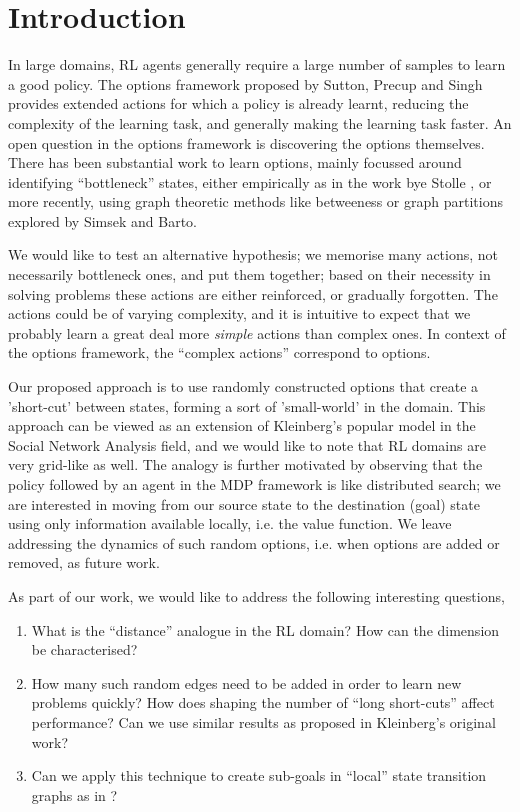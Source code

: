 \section{Introduction}
\label{sec:intro}

In large domains, RL agents generally require a large number of samples to learn
a good policy. The options framework proposed by Sutton, Precup and Singh
\cite{SuttonPrecupSingh1998} provides extended actions for which a policy is
already learnt, reducing the complexity of the learning task, and generally
making the learning task faster.  An open question in the options framework is
discovering the options themselves.  There has been substantial work to learn
options, mainly focussed around identifying ``bottleneck'' states, either
empirically as in the work bye Stolle \cite{Stolle}, or more recently, using
graph theoretic methods like betweeness \cite{Simsek} or graph partitions
\cite{Simsek2005} explored by Simsek and Barto.

We would like to test an alternative hypothesis; we memorise many actions,
not necessarily bottleneck ones, and put them together; based on their
necessity in solving problems these actions are either reinforced, or gradually
forgotten.  The actions could be of varying complexity, and it is intuitive to
expect that we probably learn a great deal more {\em simple} actions than
complex ones. In context of the options framework, the ``complex actions''
correspond to options.

Our proposed approach is to use randomly constructed options that create a
'short-cut' between states, forming a sort of 'small-world' in the domain. This
approach can be viewed as an extension of Kleinberg's popular model
\cite{Kleinberg} in the Social Network Analysis field, and we would like to note
that RL domains are very grid-like as well. The analogy is further motivated by
observing that the policy followed by an agent in the MDP framework is like
distributed search; we are interested in moving from our source state to the
destination (goal) state using only information available locally, i.e. the
value function. We leave addressing the dynamics of such random options, i.e.
when options are added or removed, as future work.

As part of our work, we would like to address the following interesting questions,
\begin{enumerate}
\item
    What is the ``distance'' analogue in the RL domain? How can the dimension
    be characterised?
\item
    How many such random edges need to be added in order to learn new problems
    quickly? How does shaping the number of ``long short-cuts'' affect
    performance? Can we use similar results as proposed in Kleinberg's original
    work?
\item
    Can we apply this technique to create sub-goals in ``local'' state transition
    graphs as in \cite{Simsek2005}?
\end{enumerate}

